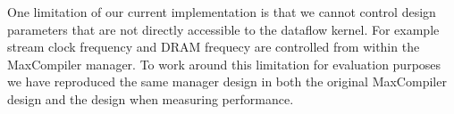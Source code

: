 One limitation of our current implementation is that we cannot control
design parameters that are not directly accessible to the dataflow
kernel. For example stream clock frequency and DRAM frequecy are
controlled from within the MaxCompiler manager. To work around this
limitation for evaluation purposes we have reproduced the same manager
design in both the original MaxCompiler design and the \FAST{} design
when measuring performance.
